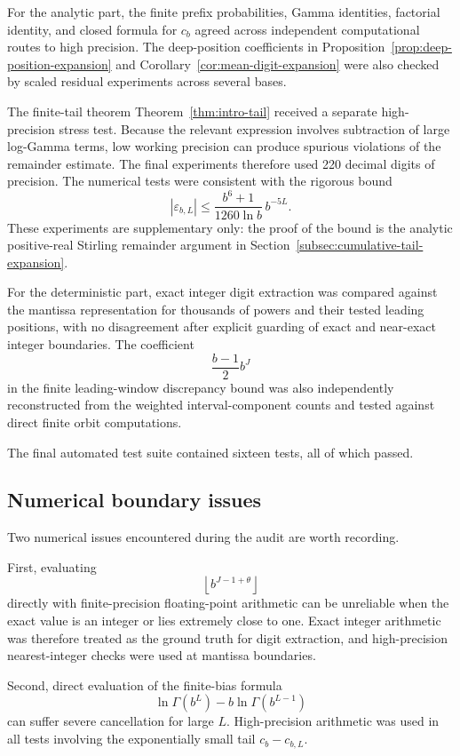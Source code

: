 \documentclass[11pt]{article}
\theoremstyle{definition}
\theoremstyle{remark}
\begin{document}
For the analytic part, the finite prefix probabilities, Gamma
identities, factorial identity, and closed formula for \(c_b\) agreed
across independent computational routes to high precision.  The
deep-position coefficients in
Proposition~\ref{prop:deep-position-expansion} and
Corollary~\ref{cor:mean-digit-expansion} were also checked by scaled
residual experiments across several bases.

The finite-tail theorem
Theorem~\ref{thm:intro-tail} received a separate
high-precision stress test.  Because the relevant expression involves
subtraction of large log-Gamma terms, low working precision can produce
spurious violations of the remainder estimate.  The final experiments
therefore used 220 decimal digits of precision.  The numerical tests
were consistent with the rigorous bound
\[
    |\varepsilon_{b,L}|
    \le
    \frac{b^6+1}{1260\ln b}\,b^{-5L}.
\]
These experiments are supplementary only: the proof of the bound is
the analytic positive-real Stirling remainder argument in
Section~\ref{subsec:cumulative-tail-expansion}.

For the deterministic part, exact integer digit extraction was compared
against the mantissa representation for thousands of powers and their
tested leading positions, with no disagreement after explicit guarding
of exact and near-exact integer boundaries.  The coefficient
\[
    \frac{b-1}{2}b^J
\]
in the finite leading-window discrepancy bound was also independently
reconstructed from the weighted interval-component counts and tested
against direct finite orbit computations.

The final automated test suite contained sixteen tests, all of which
passed.


\subsection{Numerical boundary issues}
\label{subsec:numerical-boundaries}

Two numerical issues encountered during the audit are worth recording.

First, evaluating
\[
    \left\lfloor b^{J-1+\theta}\right\rfloor
\]
directly with finite-precision floating-point arithmetic can be
unreliable when the exact value is an integer or lies extremely close
to one.  Exact integer arithmetic was therefore treated as the ground
truth for digit extraction, and high-precision nearest-integer checks
were used at mantissa boundaries.

Second, direct evaluation of the finite-bias formula
\[
    \ln\Gamma(b^L)-b\ln\Gamma(b^{L-1})
\]
can suffer severe cancellation for large \(L\).  High-precision
arithmetic was used in all tests involving the exponentially small
tail \(c_b-c_{b,L}\).
\end{document}
